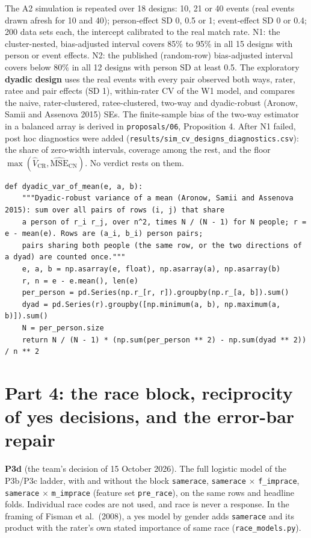 \documentclass[11pt]{article}
\begin{document}
The A2 simulation is repeated over 18 designs: 10, 21 or 40 events (real events drawn afresh for 10 and 40);
person-effect SD 0, 0.5 or 1; event-effect SD 0 or 0.4; 200 data sets each, the intercept calibrated to the real
match rate. N1: the cluster-nested, bias-adjusted interval covers 85\% to 95\% in all 15 designs with person or event
effects. N2: the published (random-row) bias-adjusted interval covers below 80\% in all 12 designs with person SD at
least 0.5. The exploratory \textbf{dyadic design} uses the real events with every pair observed both ways, rater,
ratee and pair effects (SD 1), within-rater CV of the W1 model, and compares the naive, rater-clustered,
ratee-clustered, two-way and dyadic-robust (Aronow, Samii and Assenova 2015) SEs. The finite-sample bias of the
two-way estimator in a balanced array is derived in \texttt{proposals/06}, Proposition 4. After N1 failed, post hoc
diagnostics were added (\texttt{results/sim\_cv\_designs\_diagnostics.csv}): the share of zero-width intervals, coverage
among the rest, and the floor $\max(\hat V_{\text{CR}}, \widehat{\text{MSE}}_{\text{CN}})$. No verdict rests on them.

\begin{lstlisting}[caption={Dyadic-robust variance of a mean (scripts/sim\_cv\_designs.py)}]
def dyadic_var_of_mean(e, a, b):
    """Dyadic-robust variance of a mean (Aronow, Samii and Assenova 2015): sum over all pairs of rows (i, j) that share
    a person of r_i r_j, over n^2, times N / (N - 1) for N people; r = e - mean(e). Rows are (a_i, b_i) person pairs;
    pairs sharing both people (the same row, or the two directions of a dyad) are counted once."""
    e, a, b = np.asarray(e, float), np.asarray(a), np.asarray(b)
    r, n = e - e.mean(), len(e)
    per_person = pd.Series(np.r_[r, r]).groupby(np.r_[a, b]).sum()
    dyad = pd.Series(r).groupby([np.minimum(a, b), np.maximum(a, b)]).sum()
    N = per_person.size
    return N / (N - 1) * (np.sum(per_person ** 2) - np.sum(dyad ** 2)) / n ** 2
\end{lstlisting}

\section{Part 4: the race block, reciprocity of yes decisions, and the error-bar repair}\label{sec:part4}

\textbf{P3d} (the team's decision of 15 October 2026). The full logistic model of the P3b/P3c ladder, with and without
the block \texttt{samerace}, \texttt{samerace} $\times$ \texttt{f\_imprace}, \texttt{samerace} $\times$ \texttt{m\_imprace}
(feature set \texttt{pre\_race}), on the same rows and headline folds. Individual race codes are not used, and race is
never a response. In the framing of Fisman et al.\ (2008), a yes model by gender adds \texttt{samerace} and its product
with the rater's own stated importance of same race (\texttt{race\_models.py}).
\end{document}
